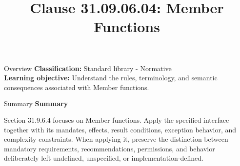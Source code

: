\documentclass[10pt,letterpaper]{article}
\title{Clause 31.09.06.04: Member Functions}
\author{}
\date{}
\begin{document}
\maketitle
\begin{CornellOverviewBox}{Overview}
\textbf{Classification:} Standard library - Normative\\[2pt]
\textbf{Learning objective:} Understand the rules, terminology, and semantic consequences associated with Member functions.
\end{CornellOverviewBox}\begin{CornellSummaryBox}{Summary}
{\sffamily\bfseries\color{Accent} Summary}\par\vspace{3pt}Section 31.9.6.4 focuses on Member functions. Apply the specified interface together with its mandates, effects, result conditions, exception behavior, and complexity constraints. When applying it, preserve the distinction between mandatory requirements, recommendations, permissions, and behavior deliberately left undefined, unspecified, or implementation-defined.
\end{CornellSummaryBox}
\end{document}

